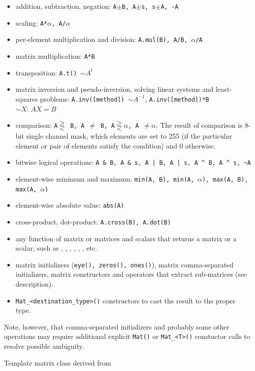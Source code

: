 \begin{itemize}
    \item addition, subtraction, negation: \texttt{A$\pm$B, A$\pm$s, s$\pm$A, -A}
    \item scaling: \texttt{A*$\alpha$, A/$\alpha$}
    \item per-element multiplication and division: \texttt{A.mul(B), A/B, $\alpha$/A}
    \item matrix multiplication: \texttt{A*B}
    \item transposition: \texttt{A.t() $\sim A^t$}
    \item matrix inversion and pseudo-inversion, solving linear systems and least-squares problems:
        \texttt{A.inv([method]) $\sim A^{-1}$}, \texttt{A.inv([method])*B $\sim X:\,AX=B$}
    \item comparison: \texttt{A$\gtreqqless$ B, A $\ne$ B, A$\gtreqqless \alpha$, A $\ne \alpha$}.
          The result of comparison is 8-bit single channel mask, which elements are set to 255
          (if the particular element or pair of elements satisfy the condition) and 0 otherwise.
    \item bitwise logical operations: \verb"A & B, A & s, A | B, A | s, A ^ B, A ^ s, ~A"
    \item element-wise minimum and maximum: \texttt{min(A, B), min(A, $\alpha$), max(A, B), max(A, $\alpha$)}
    \item element-wise absolute value: \texttt{abs(A)}
    \item cross-product, dot-product: \texttt{A.cross(B), A.dot(B)}
    \item any function of matrix or matrices and scalars that returns a matrix or a scalar, such as
          , , , , ,
          ,  etc.
    \item matrix initializers (\texttt{eye(), zeros(), ones()}), matrix comma-separated initializers,
          matrix constructors and operators that extract sub-matrices (see  description).
    \item \verb"Mat_<destination_type>()" constructors to cast the result to the proper type.
\end{itemize}
Note, however, that comma-separated initializers and probably some other operations may require additional explicit \texttt{Mat()} or \verb"Mat_<T>()" constuctor calls to resolve possible ambiguity.

\label{MatT}
Template matrix class derived from 

